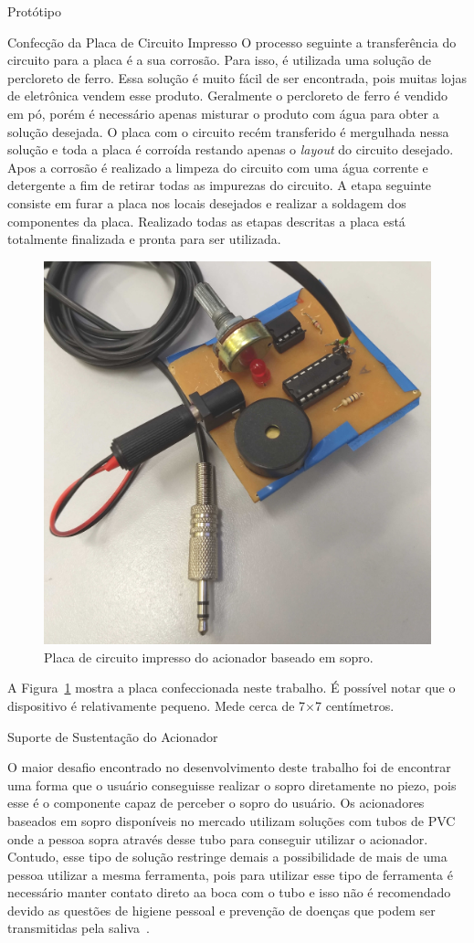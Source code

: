 \begin{chapter}{Protótipo}
\begin{section}{Confecção da Placa de Circuito Impresso}
O processo seguinte a transferência do circuito para a placa é a sua corrosão.
Para isso, é utilizada uma solução de percloreto de ferro. Essa solução é
muito fácil de ser encontrada, pois muitas lojas de eletrônica vendem esse
produto. Geralmente o percloreto de ferro é vendido em pó, porém é necessário
apenas misturar o produto com água para obter a solução desejada. O placa com o
circuito recém transferido é mergulhada nessa solução e toda a placa é corroída
restando apenas o \textit{layout} do circuito desejado. Apos a corrosão é
realizado a limpeza do circuito com uma água corrente e detergente a fim de
retirar todas as impurezas do circuito. A etapa seguinte consiste em furar a
placa nos locais desejados e realizar a soldagem dos componentes da placa.
Realizado todas as etapas descritas a placa está totalmente finalizada e pronta
para ser utilizada. 

\begin{figure}[!h]
	\centering
	\begin{minipage}[c]{\textwidth}
	\centering
	\includegraphics[width=0.45\linewidth]{fig/puff2}
	\caption{Placa de circuito impresso do acionador baseado em sopro.}
	\label{fig:placa}
	\end{minipage}
\end{figure} 

A Figura~\ref{fig:placa} mostra a placa confeccionada neste trabalho. É possível
notar que o dispositivo é relativamente pequeno. Mede cerca de 7$\times$7
centímetros.       


\end{section}


\begin{section}{Suporte de Sustentação do Acionador}

O maior desafio encontrado no desenvolvimento deste trabalho foi de encontrar
uma forma que o usuário conseguisse realizar o sopro diretamente no piezo, pois 
esse é o componente capaz de perceber o sopro do usuário. Os acionadores
baseados em sopro disponíveis no mercado utilizam soluções com tubos de PVC onde
a pessoa sopra através desse tubo para conseguir utilizar o acionador. Contudo,
esse tipo de solução restringe demais a possibilidade de mais de uma pessoa
utilizar a mesma ferramenta, pois para utilizar esse tipo de ferramenta é
necessário manter contato direto aa boca com o tubo e isso não é recomendado
devido as questões de higiene pessoal e prevenção de doenças que podem ser 
transmitidas pela saliva~\cite{Li2000}.


\end{section}
\end{chapter}
